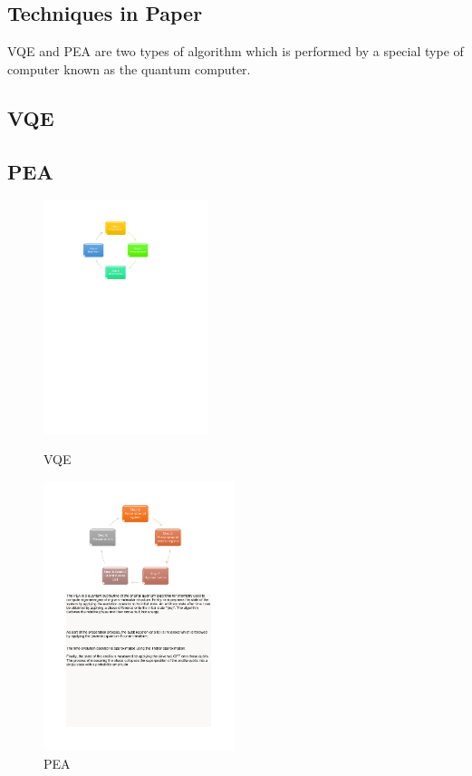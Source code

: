 \documentclass[14pt,landscape,color=UCLdarkred,margin=3cm]{uclposter}
\begin{document}
\begin{multicols}{3}
\columnbreak

\section*{Techniques in Paper}
VQE and PEA are two types of algorithm which is performed by a special type of computer known as the quantum computer.

\subsection*{VQE}

\subsection*{PEA}


\begin{figure}[H]
  \begin{center}
  \begin{minipage}[c]{15em}
    \includegraphics[width=13em]{VQEdiagram.pdf}
    \caption{VQE}
  \end{minipage}
  \qquad
  \begin{minipage}[c]{15em}
    \includegraphics[width=15em]{PEA.pdf}
    \caption{PEA}
  \end{minipage}
  \end{center}


\end{figure}
\end{multicols}
\end{document}
